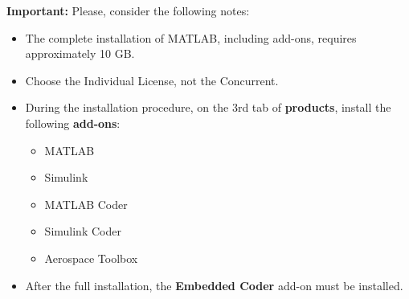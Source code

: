\textbf{\textcolor{mRedBrown}{Important:}} Please, consider the following notes:
\begin{itemize}
\item The complete installation of MATLAB, including add-ons, requires approximately 10 GB.

\item Choose the Individual License, not the Concurrent.

\item During the installation procedure, on the 3rd tab of \textbf{products}, install the following \textbf{add-ons}:
\begin{itemize}
	 \item MATLAB
	 \item Simulink
	 \item MATLAB Coder
	 \item Simulink Coder
	 \item Aerospace Toolbox
\end{itemize}

\item After the full installation, the \textbf{Embedded Coder} add-on must be installed.
\end{itemize}
